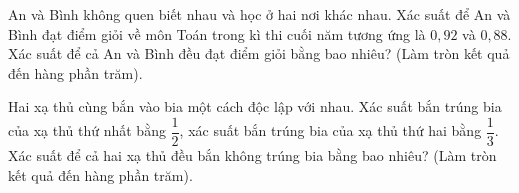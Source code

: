 \begin{ex}%
	An và Bình không quen biết nhau và học ở hai nơi khác nhau. Xác suất để An và Bình đạt điểm giỏi về môn Toán trong kì thi cuối năm tương ứng là $0{,}92$ và $0{,}88$. Xác suất để cả An và Bình đều đạt điểm giỏi bằng bao nhiêu? (Làm tròn kết quả đến hàng phần trăm).
\end{ex}

\begin{ex}%
	Hai xạ thủ cùng bắn vào bia một cách độc lập với nhau. Xác suất bắn trúng bia của xạ thủ thứ nhất bằng $\dfrac{1}{2}$, xác suất bắn trúng bia của xạ thủ thứ hai bằng $\dfrac{1}{3}$. Xác suất để cả hai xạ thủ đều bắn không trúng bia bằng bao nhiêu? (Làm tròn kết quả đến hàng phần trăm).
\end{ex}

